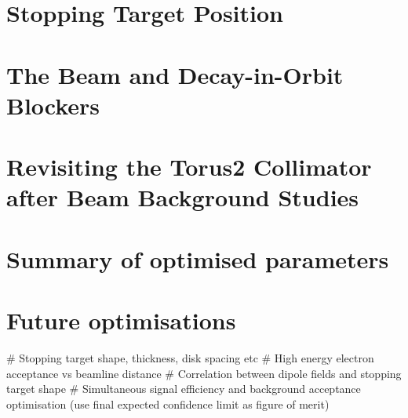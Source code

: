 \section{Stopping Target Position}
\section{The Beam and Decay-in-Orbit Blockers}

\section{Revisiting the Torus2 Collimator after Beam Background Studies}
\section{Summary of optimised parameters}
\section{Future optimisations}
\begin{easylist}
# Stopping target shape, thickness, disk spacing etc
# High energy electron acceptance vs beamline distance
# Correlation between dipole fields and stopping target shape
# Simultaneous signal efficiency and background acceptance optimisation (use final expected confidence limit as figure of merit)
\end{easylist}
